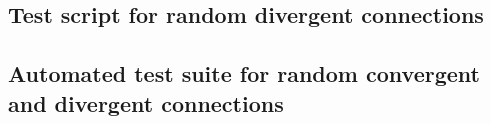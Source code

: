 \begin{landscape}
\titlespacing*{\chapter}{0pt}{-30pt}{7pt}
\titleformat{\chapter}[display]{\normalfont\huge\bfseries}{\chaptertitlename\ \thechapter}{4pt}{\Huge}\chapter{Test script for random divergent connections\label{app:rdc}}
\setlength{\columnsep}{0.9cm}
\begin{multicols*}{2}

\end{multicols*}
\end{landscape}
\clearchapter



\begin{landscape}
\titlespacing*{\chapter}{0pt}{-30pt}{7pt}
\titleformat{\chapter}[display]{\normalfont\huge\bfseries}{\chaptertitlename\ \thechapter}{4pt}{\Huge}\chapter{Automated test suite for random convergent and divergent connections\label{app:unit}}
\setlength{\columnsep}{0.9cm}
\begin{multicols*}{2}

\end{multicols*}
\end{landscape}
\clearchapter



